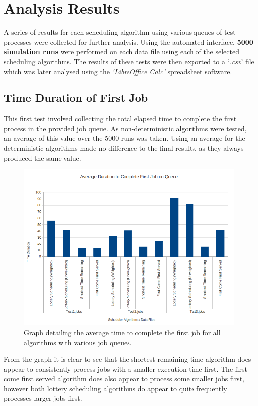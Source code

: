 \documentclass{acm_proc_article-sp}
\begin{document}
\section{Analysis Results}
A series of results for each scheduling algorithm using various queues of test processes were collected for further analysis. Using the automated interface, \textbf{5000 simulation runs} were performed on each data file using each of the selected scheduling algorithms. The results of these tests were then exported to a `\textit{.csv}' file which was later analysed using the \emph{`LibreOffice Calc'} spreadsheet software.

\subsection{Time Duration of First Job}
This first test involved collecting the total elapsed time to complete the first process in the provided job queue. As non-deterministic algorithms were tested, an average of this value over the 5000 runs was taken. Using an average for the deterministic algorithms made no difference to the final results, as they always produced the same value. 

\begin{figure}[!htbp]
\centering
\includegraphics[scale=0.29]{graph_firstjobtime1.png}
\caption{Graph detailing the average time to complete the first job for all algorithms with various job queues.}
\end{figure}

From the graph it is clear to see that the shortest remaining time algorithm does appear to consistently process jobs with a smaller execution time first. The first come first served algorithm does also appear to process some smaller jobs first, however both lottery scheduling algorithms do appear to quite frequently processes larger jobs first. 
\end{document}
